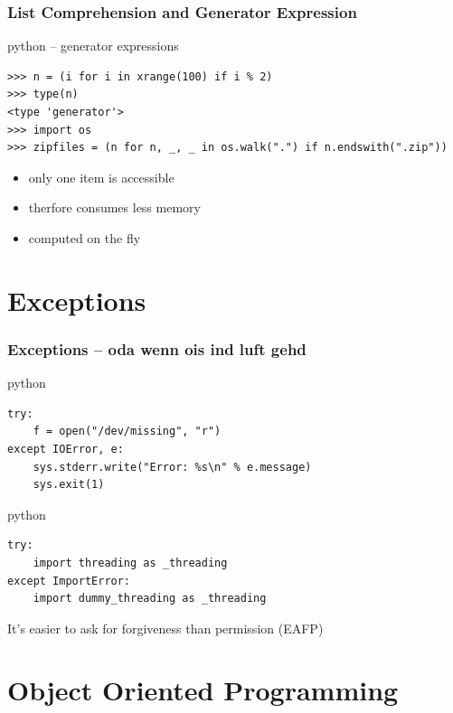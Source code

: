 \documentclass{beamer}
\begin{document}
\begin{frame}[fragile]
	\frametitle{List Comprehension and Generator Expression}
	\begin{exampleblock}{python -- generator expressions}
	\begin{lstlisting}
>>> n = (i for i in xrange(100) if i % 2)
>>> type(n)
<type 'generator'>
>>> import os
>>> zipfiles = (n for n, _, _ in os.walk(".") if n.endswith(".zip"))
	\end{lstlisting}
	\end{exampleblock}

	\begin{itemize}
		\item only one item is accessible
		\item therfore consumes less memory
		\item computed on the fly
	\end{itemize}
\end{frame}

\section{Exceptions}	%

\begin{frame}[fragile]
	\frametitle{Exceptions -- oda wenn ois ind luft gehd}
	\begin{exampleblock}{python}
	\begin{lstlisting}
try:
    f = open("/dev/missing", "r")
except IOError, e:
    sys.stderr.write("Error: %s\n" % e.message)
    sys.exit(1)
	\end{lstlisting}
	\end{exampleblock}

\pause

	\begin{exampleblock}{python}
	\begin{lstlisting}
try:
    import threading as _threading
except ImportError:
    import dummy_threading as _threading
	\end{lstlisting}
	\end{exampleblock}
	
	It's easier to ask for forgiveness than permission (EAFP)
\end{frame}

\section{Object Oriented Programming}
\end{document}
